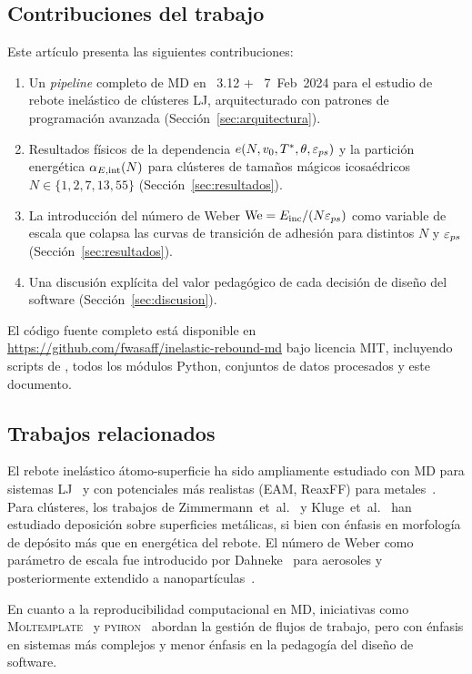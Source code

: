 \subsection{Contribuciones del trabajo}

Este artículo presenta las siguientes contribuciones:

\begin{enumerate}
    \item Un \textit{pipeline} completo de MD en \python{}~3.12 +
          \lammps{}~7~Feb~2024 para el estudio de rebote inelástico de
          clústeres LJ, arquitecturado con patrones de programación avanzada
          (Sección~\ref{sec:arquitectura}).

    \item Resultados físicos de la dependencia $e(N, v_0, T^{*}, \theta,
          \varepsilon_{ps})$ y la partición energética $\alpha_{E,\mathrm{int}}(N)$ para clústeres de
          tamaños mágicos icosaédricos $N \in \{1, 2, 7, 13, 55\}$
          (Sección~\ref{sec:resultados}).

    \item La introducción del número de Weber $\mathrm{We} = E_{\mathrm{inc}}/(N\varepsilon_{ps})$ como
          variable de escala que colapsa las curvas de transición de adhesión
          para distintos $N$ y $\varepsilon_{ps}$ (Sección~\ref{sec:resultados}).

    \item Una discusión explícita del valor pedagógico de cada decisión de
          diseño del software (Sección~\ref{sec:discusion}).
\end{enumerate}

El código fuente completo está disponible
en \url{https://github.com/fwasaff/inelastic-rebound-md} bajo licencia MIT,
incluyendo scripts de \lammps{}, todos los módulos Python, conjuntos de datos
procesados y este documento.

\subsection{Trabajos relacionados}

El rebote inelástico átomo-superficie ha sido ampliamente estudiado con MD para
sistemas LJ~\cite{Tully1980, Head-Gordon1991, Binnie2004} y con potenciales más
realistas (EAM, ReaxFF) para metales~\cite{Foiles1986}. Para clústeres, los
trabajos de Zimmermann~et~al.~\cite{Zimmermann2021} y Kluge~et~al.~\cite{Kluge2020}
han estudiado deposición sobre superficies metálicas, si bien con énfasis en
morfología de depósito más que en energética del rebote. El número de Weber como
parámetro de escala fue introducido por Dahneke~\cite{Dahneke1975} para
aerosoles y posteriormente extendido a nanopartículas~\cite{Hou2000,Inaba2004}.

En cuanto a la reproducibilidad computacional en MD, iniciativas como
\textsc{Moltemplate}~\cite{Jewett2021} y \textsc{pyiron}~\cite{Janssen2019}
abordan la gestión de flujos de trabajo, pero con énfasis en sistemas más
complejos y menor énfasis en la pedagogía del diseño de software.
